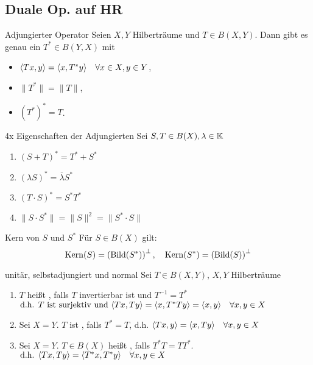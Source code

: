 \subsection*{Duale Op. auf HR}

\begin{karte}{Adjungierter Operator}
	Seien $X, Y$ Hilberträume und $T \in B(X, Y)$. Dann gibt es genau ein $T^{*} \in B(Y, X)$ mit
	\begin{itemize}
		\item $\langle T x , y \rangle = \langle x , T^{*} y \rangle \quad \forall x \in X, y \in Y$,
		\item $\| T^{*} \| = \| T \|$,
		\item $\left(T	^{*}\right)^{*} = T$.
	\end{itemize}	
\end{karte}

\begin{karte}{4x Eigenschaften der Adjungierten}
	Sei $S, T \in B(X), \lambda \in \mathbb{K}$
	\begin{enumerate}[label=\alph*\upshape)]
		\item $\left( S + T \right)^{*} = T^{*} + S^{*}$
		\item $\left( \lambda S \right)^{*} = \overline{\lambda} S^{*}$
		\item $\left( T \cdot S \right)^{*} = S^{*} T^{*}$
		\item $\| S \cdot S^{*} \| = \| S \|^{2} = \| S^{*} \cdot S \|$
	\end{enumerate}
\end{karte}

\begin{karte}{Kern von $S$ und $S^{*}$}
	Für $S \in B(X)$ gilt:
	\[ \mathop{\rm Kern}\nolimits(S) = \left( \mathop{\rm Bild}\nolimits(S^{*}) \right)^{\bot}, \quad \mathop{\rm Kern}\nolimits(S^{*}) = \left( \mathop{\rm Bild}\nolimits(S) \right)^{\bot} \]	
\end{karte}

\begin{karte}{unitär, selbstadjungiert und normal}
	Sei $T \in B(X, Y)$, $X, Y$ Hilberträume
	\begin{enumerate}[label=\alph*\upshape)]
		\item $T$ hei{\ss}t , falls $T$ invertierbar ist und $T^{-1} = T^{*}$ $\text{d.h. } T \text{ ist surjektiv und } \langle Tx , Ty \rangle = \langle x , T^{*} T y \rangle = \langle x , y \rangle \quad \forall x, y \in X$
		\item Sei $X = Y$. $T$ ist , falls $T^{*} = T$, d.h. $\langle Tx , y \rangle = \langle x , T y \rangle \quad \forall x, y \in X$
		\item Sei $X = Y$. $T \in B(X)$ hei{\ss}t , falls $T^{*} T = T T^{*}$. $\text{d.h. } \langle Tx , Ty \rangle = \langle T^{*} x , T^{*} y \rangle \quad \forall x, y \in X$
	\end{enumerate}
\end{karte}


